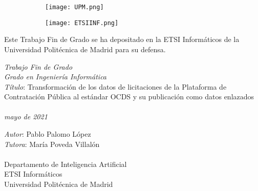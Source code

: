 \thispagestyle{empty} %

\begin{center}
    
    \centering
    \begin{figure}[h]
        \centering
        \begin{subfigure}[b]{0.5\linewidth}
            \centering
        	\texttt{[image: UPM.png]}
    	\end{subfigure}\hfill
    	\centering
        \begin{subfigure}[b]{0.5\linewidth}
            \centering
        	\texttt{[image: ETSIINF.png]}
        \end{subfigure}
	\end{figure}
	
	\printtitle
	
    \vfill
    
    \printauthor
    
    \printdate
\end{center}


    \vspace*{2cm}
    \noindent Este Trabajo Fin de Grado se ha depositado en la ETSI Informáticos de la Universidad Politécnica de Madrid para su defensa. \\
    
    \vspace*{10cm}
    
    \noindent \textit{Trabajo Fin de Grado} \\
    \textit{Grado en Ingeniería Informática} \\
    \textit{Título}: Transformación de los datos de licitaciones de la Plataforma de Contratación Pública al estándar OCDS y su publicación como datos enlazados \\ \\
    \textit{mayo de 2021} \\
    
    \vspace*{2cm}
    
    \noindent \textit{Autor}: Pablo Palomo López \\
    \textit{Tutora}: María Poveda Villalón \\ \\
    Departamento de Inteligencia Artificial \\
    ETSI Informáticos \\
    Universidad Politécnica de Madrid \\
    
\thispagestyle{empty} %
\setcounter{page}{0}    %
\setcounter{figure}{0}  %